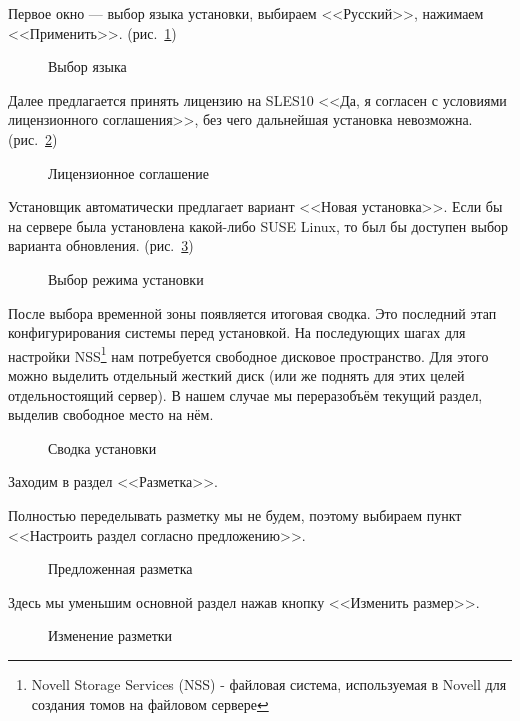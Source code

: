 Первое окно — выбор языка установки, выбираем <<Русский>>, нажимаем <<Применить>>. (рис.~\ref{fig2})
\begin{figure}[H]
\caption{Выбор языка}
\label{fig2}
\end{figure}
\clearpage

Далее предлагается принять лицензию на SLES10 <<Да, я согласен с условиями лицензионного соглашения>>, без чего дальнейшая установка невозможна. (рис.~\ref{fig3})
\begin{figure}[H]
\caption{Лицензионное соглашение}
\label{fig3}
\end{figure}
\clearpage

Установщик автоматически предлагает вариант <<Новая установка>>. Если бы на сервере была установлена какой-либо SUSE Linux, то был бы доступен выбор варианта обновления. (рис.~\ref{fig4})
\begin{figure}[H]
\caption{Выбор режима установки}
\label{fig4}
\end{figure}
\clearpage

После выбора временной зоны появляется итоговая сводка. Это последний этап конфигурирования системы перед установкой. На последующих шагах для настройки NSS\footnote{Novell Storage Services (NSS) - файловая система, используемая в Novell для создания томов на файловом сервере} нам потребуется свободное дисковое пространство. Для этого можно выделить отдельный жесткий диск (или же поднять для этих целей отдельностоящий сервер). В нашем случае мы переразобъём текущий раздел, выделив свободное место на нём.
\begin{figure}[H]
\caption{Сводка установки}
\label{p1}
\end{figure}
Заходим в раздел <<Разметка>>.
\clearpage

Полностью переделывать разметку мы не будем, поэтому выбираем пункт <<Настроить раздел согласно предложению>>.
\begin{figure}[H]
\caption{Предложенная разметка}
\label{p2}
\end{figure}
\clearpage

Здесь мы уменьшим основной раздел нажав кнопку <<Изменить размер>>.
\begin{figure}[H]
\caption{Изменение разметки}
\label{p3}
\end{figure}
\clearpage

